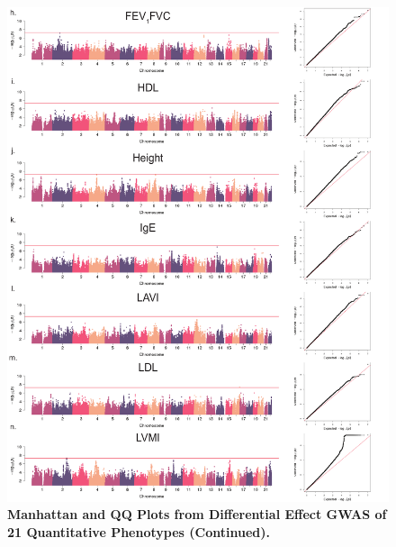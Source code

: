 \begin{figure}[!htb]
	\ContinuedFloat
	\centering
	\includegraphics[width=5in]{img/ch02/fig-s7b.pdf}
	\caption[]{\textbf{Manhattan and QQ Plots from Differential Effect GWAS of 21 Quantitative Phenotypes (Continued).} }
	\label{fig:fig-s7b}
\end{figure}



